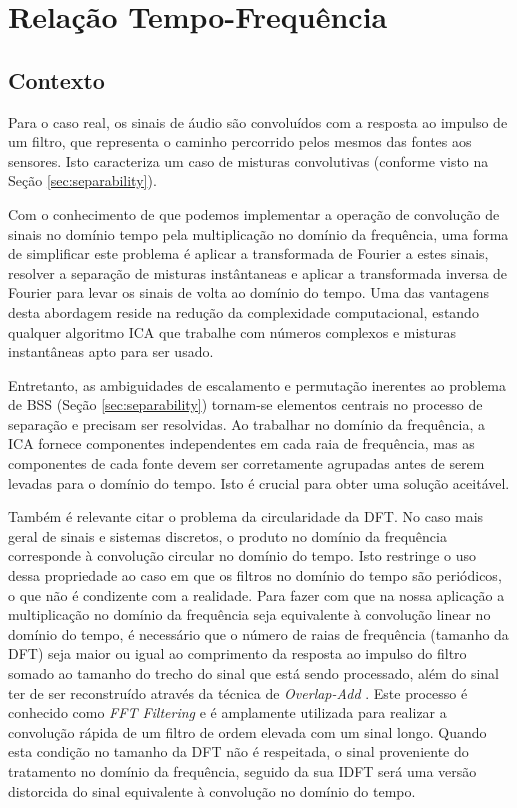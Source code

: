 \label{chap:3}

\section{Relação Tempo-Frequência}
    
    \subsection{Contexto}
        Para o caso real, os sinais de áudio são convoluídos com a resposta ao impulso de um filtro, que representa o caminho percorrido pelos mesmos das fontes aos sensores. Isto caracteriza um caso de misturas convolutivas (conforme visto na Seção \ref{sec:separability}). 
        
        Com o conhecimento de que podemos implementar a operação de convolução de sinais no domínio tempo pela  multiplicação no domínio da frequência, uma forma de simplificar este problema é aplicar a transformada de Fourier a estes sinais, resolver a separação de misturas instântaneas e aplicar a transformada inversa de Fourier para levar os sinais de volta ao domínio do tempo. Uma das vantagens desta abordagem reside na redução da complexidade computacional, estando qualquer algoritmo ICA que trabalhe com números complexos e misturas instantâneas apto para ser usado.
        
        Entretanto, as ambiguidades de escalamento e permutação inerentes ao problema de BSS (Seção \ref{sec:separability}) tornam-se elementos centrais no processo de separação e precisam ser resolvidas. Ao trabalhar no domínio da frequência, a ICA fornece componentes independentes em cada raia de frequência, mas as componentes de cada fonte devem ser corretamente agrupadas antes de serem levadas para o domínio do tempo. Isto é crucial para obter uma solução aceitável.
        
        Também é relevante citar o problema da circularidade da DFT. No caso mais geral de sinais e sistemas discretos, o produto no domínio da frequência corresponde à convolução circular no domínio do tempo. Isto restringe o uso dessa propriedade ao caso em que os filtros no domínio do tempo são periódicos, o que não é condizente com a realidade. Para fazer com que na nossa aplicação a multiplicação no domínio da frequência seja equivalente à convolução linear no domínio do tempo, é necessário que o número de raias de frequência (tamanho da DFT) seja maior ou igual ao comprimento da resposta ao impulso do filtro somado ao tamanho do trecho do sinal que está sendo processado, além do sinal ter de ser reconstruído através da técnica de \textit{Overlap-Add} \cite{signalprocessing} . Este processo é conhecido como \textit{FFT Filtering} e é amplamente utilizada para realizar a convolução rápida de um filtro de ordem elevada com um sinal longo. Quando esta condição no tamanho da DFT não é respeitada, o sinal proveniente do tratamento no domínio da frequência, seguido da sua IDFT será uma versão distorcida do sinal equivalente à convolução no domínio do tempo.
        
